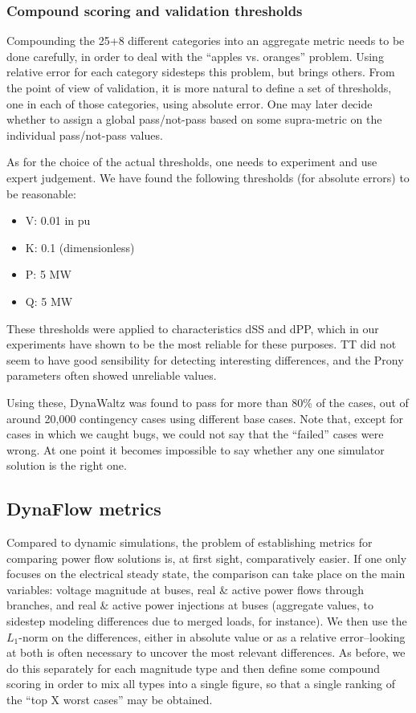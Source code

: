 \documentclass[conference]{IEEEtran}
\begin{document}
\subsubsection{Compound scoring and validation thresholds}

Compounding the 25+8 different categories into an aggregate metric needs to be
done carefully, in order to deal with the ``apples vs. oranges'' problem. Using
relative error for each category sidesteps this problem, but brings others.
From the point of view of validation, it is more natural to define a set of
thresholds, one in each of those categories, using absolute error. One may later
decide whether to assign a global pass/not-pass based on some supra-metric on
the individual pass/not-pass values.

As for the choice of the actual thresholds, one needs to experiment and use
expert judgement. We have found the following thresholds (for absolute errors)
to be reasonable:
\begin{itemize}
  \item V: 0.01 in pu
  \item K: 0.1 (dimensionless)
  \item P: 5 MW
  \item Q: 5 MW
\end{itemize}
These thresholds were applied to characteristics dSS and dPP, which in our
experiments have shown to be the most reliable for these purposes. TT did not
seem to have good sensibility for detecting interesting differences, and the
Prony parameters often showed unreliable values.

Using these, DynaWaltz was found to pass for more than 80\% of the cases, out of
around 20,000 contingency cases using different base cases.  Note that, except
for cases in which we caught bugs, we could not say that the ``failed'' cases
were wrong.  At one point it becomes impossible to say whether any one simulator
solution is the right one.



\subsection{DynaFlow metrics}

Compared to dynamic simulations, the problem of establishing metrics for
comparing power flow solutions is, at first sight, comparatively easier. If one
only focuses on the electrical steady state, the comparison can take place on
the main variables: voltage magnitude at buses, real \& active power flows
through branches, and real \& active power injections at buses (aggregate
values, to sidestep modeling differences due to merged loads, for instance). We
then use the $L_1$-norm on the differences, either in absolute value or as a
relative error--looking at both is often necessary to uncover the most relevant
differences. As before, we do this separately for each magnitude type and then
define some compound scoring in order to mix all types into a single figure, so
that a single ranking of the ``top X worst cases'' may be obtained.
\end{document}
